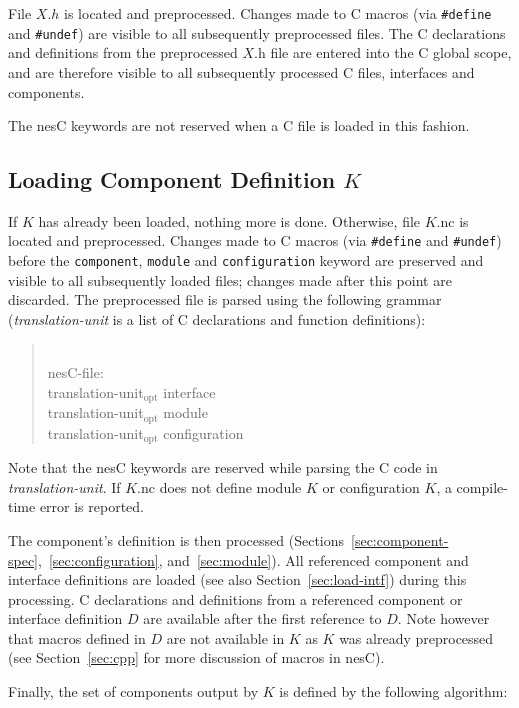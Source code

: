 \documentclass[11pt,letterpaper]{article}
\newcommand{\kw}[1]{{\tt #1}}
\newcommand{\code}[1]{{\tt #1}}
\newcommand{\nesc}{nesC\xspace}
\newcommand{\opt}{$_{\mbox{opt}}$\xspace}
\newcommand{\grammarshift}{\vspace*{-.7cm}}
\newcommand{\grammarindent}{\hspace*{2cm}\= \\ \kill}
\begin{document}
File $X.h$ is located and preprocessed. Changes made to C macros (via
\code{\#define} and \code{\#undef}) are visible to all subsequently
preprocessed files. The C declarations and definitions from the
preprocessed $X$.h file are entered into the C global scope, and are
therefore visible to all subsequently processed C files, interfaces and
components. 

The \nesc keywords are not reserved when a C file is loaded in this
fashion.

\subsection{Loading Component Definition $K$}
\label{sec:load-component}

If $K$ has already been loaded, nothing more is done. Otherwise, file
$K$.nc is located and preprocessed. Changes made to C macros (via
\code{\#define} and \code{\#undef}) before the \kw{component}, \kw{module}
and \kw{configuration} keyword are preserved and visible to all
subsequently loaded files; changes made after this point are discarded. The
preprocessed file is parsed using the following grammar 
(\emph{translation-unit} is a list of C declarations and function definitions):
\begin{quote} \grammarshift \em \begin{tabbing}
\grammarindent
nesC-file: \\
\>	translation-unit\opt interface\\
\>	translation-unit\opt module\\
\>	translation-unit\opt configuration
\end{tabbing} \end{quote}
Note that the \nesc keywords are reserved while parsing the C code in
\emph{translation-unit}. If $K$.nc does not define module $K$ or
configuration $K$, a compile-time error is reported.

The component's definition is then processed
(Sections~\ref{sec:component-spec},~\ref{sec:configuration},
and~\ref{sec:module}). All referenced component and interface definitions
are loaded (see also Section~\ref{sec:load-intf}) during this processing.
C declarations and definitions from a referenced component or interface
definition $D$ are available after the first reference to $D$. Note
however that macros defined in $D$ are not available in $K$ as $K$
was already preprocessed (see Section~\ref{sec:cpp} for more discussion
of macros in \nesc).

Finally, the set of components output by $K$ is defined by the following
algorithm:
\end{document}
